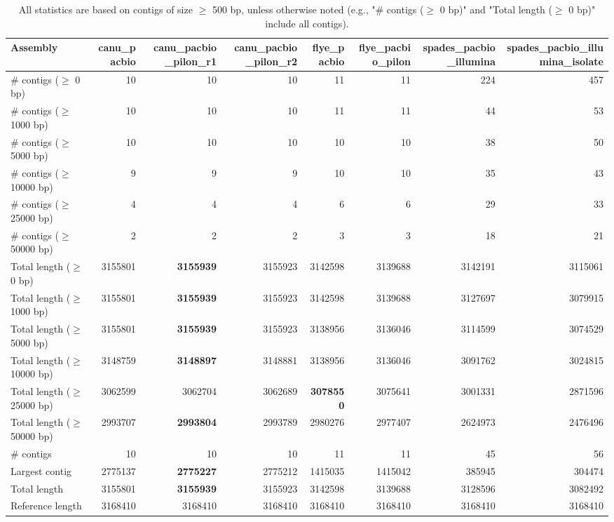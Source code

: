\documentclass[12pt,a4paper]{article}
\begin{document}
\begin{table}[ht]
\begin{center}
\caption{All statistics are based on contigs of size $\geq$ 500 bp, unless otherwise noted (e.g., "\# contigs ($\geq$ 0 bp)" and "Total length ($\geq$ 0 bp)" include all contigs).}
\begin{tabular}{|l*{7}{|r}|}
\hline
Assembly & canu\_pacbio & canu\_pacbio\_pilon\_r1 & canu\_pacbio\_pilon\_r2 & flye\_pacbio & flye\_pacbio\_pilon & spades\_pacbio\_illumina & spades\_pacbio\_illumina\_isolate \\ \hline
\# contigs ($\geq$ 0 bp) & 10 & 10 & 10 & 11 & 11 & 224 & 457 \\ \hline
\# contigs ($\geq$ 1000 bp) & 10 & 10 & 10 & 11 & 11 & 44 & 53 \\ \hline
\# contigs ($\geq$ 5000 bp) & 10 & 10 & 10 & 10 & 10 & 38 & 50 \\ \hline
\# contigs ($\geq$ 10000 bp) & 9 & 9 & 9 & 10 & 10 & 35 & 43 \\ \hline
\# contigs ($\geq$ 25000 bp) & 4 & 4 & 4 & 6 & 6 & 29 & 33 \\ \hline
\# contigs ($\geq$ 50000 bp) & 2 & 2 & 2 & 3 & 3 & 18 & 21 \\ \hline
Total length ($\geq$ 0 bp) & 3155801 & {\bf 3155939} & 3155923 & 3142598 & 3139688 & 3142191 & 3115061 \\ \hline
Total length ($\geq$ 1000 bp) & 3155801 & {\bf 3155939} & 3155923 & 3142598 & 3139688 & 3127697 & 3079915 \\ \hline
Total length ($\geq$ 5000 bp) & 3155801 & {\bf 3155939} & 3155923 & 3138956 & 3136046 & 3114599 & 3074529 \\ \hline
Total length ($\geq$ 10000 bp) & 3148759 & {\bf 3148897} & 3148881 & 3138956 & 3136046 & 3091762 & 3024815 \\ \hline
Total length ($\geq$ 25000 bp) & 3062599 & 3062704 & 3062689 & {\bf 3078550} & 3075641 & 3001331 & 2871596 \\ \hline
Total length ($\geq$ 50000 bp) & 2993707 & {\bf 2993804} & 2993789 & 2980276 & 2977407 & 2624973 & 2476496 \\ \hline
\# contigs & 10 & 10 & 10 & 11 & 11 & 45 & 56 \\ \hline
Largest contig & 2775137 & {\bf 2775227} & 2775212 & 1415035 & 1415042 & 385945 & 304474 \\ \hline
Total length & 3155801 & {\bf 3155939} & 3155923 & 3142598 & 3139688 & 3128596 & 3082492 \\ \hline
Reference length & 3168410 & 3168410 & 3168410 & 3168410 & 3168410 & 3168410 & 3168410 \\ \hline

\end{tabular}
\end{center}
\end{table}
\end{document}
